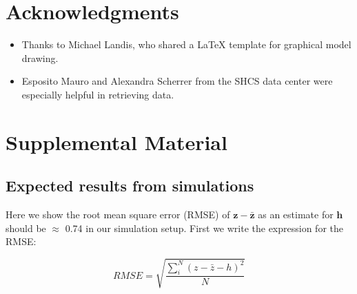 \documentclass[]{article}
\newcommand{\beginsupplement}{%
	\setcounter{table}{0}
	\renewcommand{\thetable}{S\arabic{table}}%
	\setcounter{figure}{0}
	\renewcommand{\thefigure}{S\arabic{figure}}%
}
\begin{document}
\begin{doublespace}
\section{Acknowledgments}

\begin{itemize}
	\item Thanks to Michael Landis, who shared a LaTeX template for graphical model drawing.
	\item Esposito Mauro and Alexandra Scherrer from the SHCS data center were especially helpful in retrieving data.
\end{itemize}



\newpage
\section{Supplemental Material}
\beginsupplement

\subsection{Expected results from simulations}

Here we show the root mean square error (RMSE) of $\bm{z} - \bm{\bar{z}}$ as an estimate for $\bm{h}$ should be $\approx$ 0.74 in our simulation setup. First we write the expression for the RMSE:

\begin{equation}
    RMSE = \sqrt{\frac{\sum_i^N(z - \bar{z} - h)^2}{N}}
\end{equation}


\end{doublespace}
\end{document}
